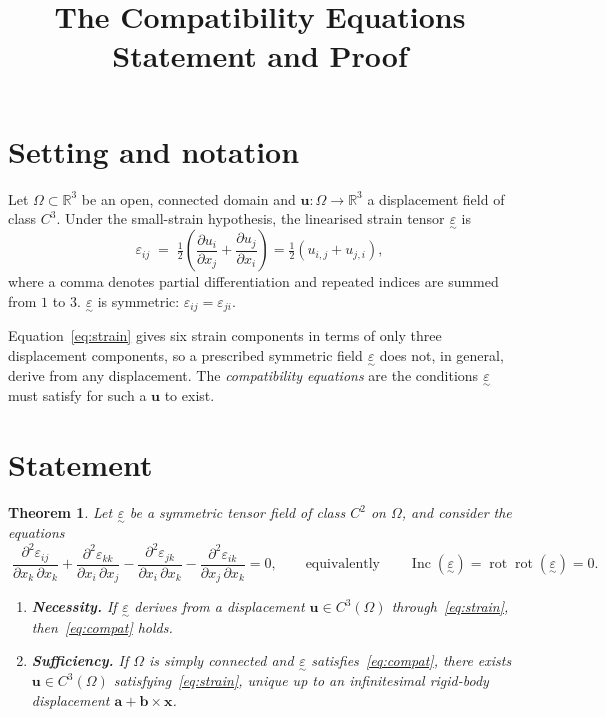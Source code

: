 \documentclass[11pt,a4paper]{article}
\title{The Compatibility Equations\\[2pt]\large Statement and Proof}
\author{}
\date{}
\newtheorem{theorem}{Theorem}
\theoremstyle{remark}
\newcommand{\eps}{\varepsilon}
\newcommand{\teps}{\underset{\sim}{\varepsilon}}
\newcommand{\rot}{\operatorname{rot}}
\newcommand{\Inc}{\operatorname{Inc}}
\newcommand{\pd}[2]{\frac{\partial #1}{\partial #2}}
\newcommand{\pdd}[3]{\frac{\partial^2 #1}{\partial #2\,\partial #3}}
\begin{document}
\maketitle

\section{Setting and notation}

Let $\Omega\subset\mathbb{R}^3$ be an open, connected domain and $\boldsymbol{u}:\Omega\to\mathbb{R}^3$
a displacement field of class $C^3$. Under the small-strain hypothesis, the linearised strain tensor $\teps$ is
\begin{equation}\label{eq:strain}
  \eps_{ij} \;=\; \tfrac12\left(\pd{u_i}{x_j}+\pd{u_j}{x_i}\right) = \tfrac12\left(u_{i,j}+u_{j,i}\right),
\end{equation}
where a comma denotes partial differentiation and repeated indices are summed from $1$ to $3$.
$\teps$ is symmetric: $\eps_{ij}=\eps_{ji}$.

Equation~\eqref{eq:strain} gives six strain components in terms of only three displacement components,
so a prescribed symmetric field $\teps$ does not, in general, derive from any displacement.
The \emph{compatibility equations} are the conditions $\teps$ must satisfy for such a $\boldsymbol u$ to exist.

\section{Statement}

\begin{theorem}\label{thm:main}
Let $\teps$ be a symmetric tensor field of class $C^2$ on $\Omega$, and consider the equations
\begin{equation}\label{eq:compat}
  \boxed{\;
  \pdd{\eps_{ij}}{x_k}{x_k}+\pdd{\eps_{kk}}{x_i}{x_j}-\pdd{\eps_{jk}}{x_i}{x_k}-\pdd{\eps_{ik}}{x_j}{x_k}=0,
  \qquad\text{equivalently}\qquad
  \Inc(\teps)=\rot\rot(\teps)=0.\;}
\end{equation}
\begin{enumerate}
  \item[(a)] \textbf{Necessity.} If $\teps$ derives from a displacement $\boldsymbol u\in C^3(\Omega)$ through~\eqref{eq:strain}, then~\eqref{eq:compat} holds.
  \item[(b)] \textbf{Sufficiency.} If $\Omega$ is simply connected and $\teps$ satisfies~\eqref{eq:compat}, there exists $\boldsymbol u\in C^3(\Omega)$ satisfying~\eqref{eq:strain}, unique up to an infinitesimal rigid-body displacement $\boldsymbol a+\boldsymbol b\times\boldsymbol x$.
\end{enumerate}
\end{theorem}
\end{document}
